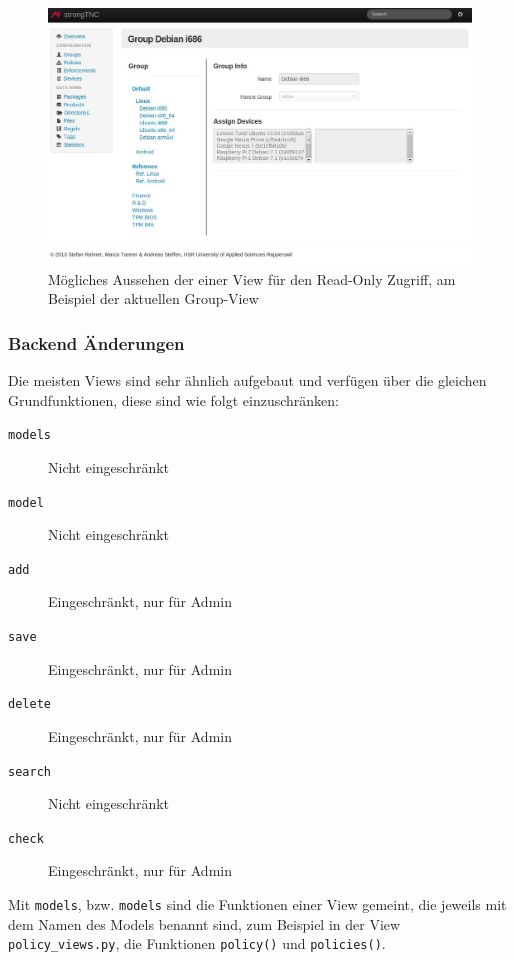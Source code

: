 \begin{figure}[H]
	\centering
	\includegraphics[width=\textwidth]{images/rollen-konzept/group-view-read-only.jpg}
	\caption{Mögliches Aussehen der einer View für den Read-Only Zugriff, am Beispiel der aktuellen Group-View}
\end{figure}


\subsubsection{Backend Änderungen}

Die meisten Views sind sehr ähnlich aufgebaut und verfügen über die gleichen Grundfunktionen, 
diese sind wie folgt einzuschränken:

\begin{description}
    \item [\texttt{models}] Nicht eingeschränkt
    \item [\texttt{model}] Nicht eingeschränkt
    \item [\texttt{add}] Eingeschränkt, nur für Admin
    \item [\texttt{save}] Eingeschränkt, nur für Admin
    \item [\texttt{delete}] Eingeschränkt, nur für Admin
    \item [\texttt{search}] Nicht eingeschränkt
    \item [\texttt{check}] Eingeschränkt, nur für Admin
\end{description}

Mit \texttt{models}, bzw. \texttt{models} sind die Funktionen einer View gemeint, die jeweils mit dem
Namen des Models benannt sind, zum Beispiel in der View \texttt{policy\_views.py}, die Funktionen
\texttt{policy()} und \texttt{policies()}.

